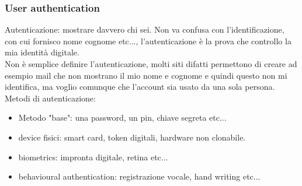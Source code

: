 \documentclass[16px]{article}
\begin{document}
\subsubsection{User authentication}
Autenticazione: mostrare davvero chi sei. Non va confusa con l'identificazione, con cui fornisco nome cognome etc..., l'autenticazione è la prova che controllo la mia identità digitale.\\ Non è semplice definire l'autenticazione, molti siti difatti permettono di creare ad esempio mail che non mostrano il mio nome e cognome e quindi questo non mi identifica, ma voglio comunque che l'account sia usato da una sola persona.\\ Metodi di autenticazione:
\begin{itemize}
\item Metodo "base": una password, un pin, chiave segreta etc...
\item device fisici: smart card, token digitali, hardware non clonabile.
\item biometrics: impronta digitale, retina etc...
\item behavioural authentication: registrazione vocale, hand writing etc...
\end{itemize}
\end{document}
